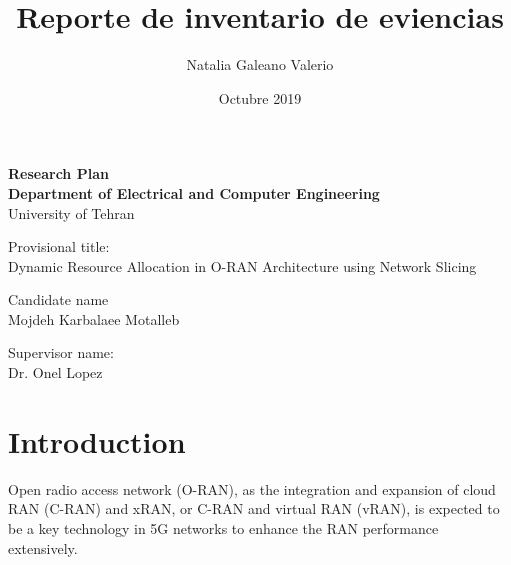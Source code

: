 \documentclass{article}
\title{Reporte de inventario de eviencias}
\author{Natalia Galeano Valerio}
\date{Octubre 2019}
\begin{document}
\baselineskip 12pt

\vspace*{30mm}

\begin{center}

\textbf{\Large Research Plan} \\
\vspace{10mm}
\textbf{Department of Electrical and Computer Engineering}\\
\vspace{20mm}
{\large University of Tehran}\\
\vspace{20mm}
\end{center}
\vspace{10mm}
{\scriptsize Provisional title:}\\
Dynamic Resource Allocation in O-RAN Architecture using Network Slicing\\

\vspace{20mm}

{\scriptsize Candidate name}\\
Mojdeh Karbalaee Motalleb \\
\vspace{3mm}



{\scriptsize Supervisor name:}\\
Dr. Onel Lopez\\
\vspace{3mm}


\pagebreak
\section{Introduction}
Open radio access network (O-RAN), as the integration and expansion of cloud RAN (C-RAN) and xRAN, or C-RAN and virtual RAN (vRAN), is expected to be a key technology in 5G networks to enhance the RAN performance extensively. 
\end{document}
